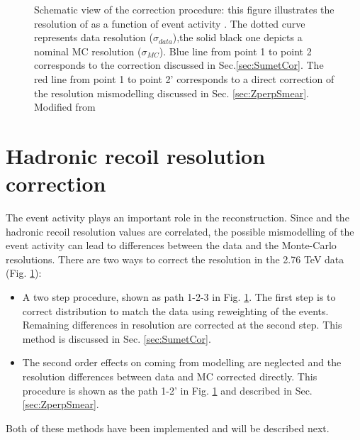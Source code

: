 \begin{figure}[!t]
\begin{center}

\begin{minipage}[h]{0.7\linewidth}
\end{minipage}

\end{center}
\caption{Schematic view of the correction procedure: this figure illustrates the resolution of \uperp as a function of event activity \sumet. The dotted curve represents data resolution ($\sigma_{data}$),the solid black one depicts a nominal MC resolution ($\sigma_{MC}$). Blue line from point 1 to point 2 corresponds to the \sumet correction discussed in Sec.\ref{sec:SumetCor}. The red line from point 1 to point 2' corresponds to a direct correction of the resolution mismodelling discussed in Sec. \ref{sec:ZperpSmear}. Modified from \cite{HRCorrections}}

\label{ris:sumetCor}
\end{figure}

\section{Hadronic recoil resolution correction}




The event activity plays an important role in the \etmiss reconstruction. Since \sumet and the hadronic recoil resolution values are correlated, the possible mismodelling of the event activity can lead to differences between the data and the Monte-Carlo \etmiss resolutions. There are two ways to correct the resolution in the 2.76 TeV data (Fig. \ref{ris:sumetCor}):
\begin{itemize}
\item A two step procedure, shown as path 1-2-3 in Fig. \ref{ris:sumetCor}. The first step is to correct \sumet distribution to match the data using reweighting of the events. Remaining differences in resolution are corrected at the second step. This method is discussed in Sec. \ref{sec:SumetCor}. 
\item The second order effects on \etmiss coming from \sumet modelling are neglected and the resolution differences between data and MC corrected directly. This procedure is shown as the path 1-2' in Fig. \ref{ris:sumetCor} and described in Sec. \ref{sec:ZperpSmear}.
\end{itemize}
Both of these methods have been implemented and will be described next.

